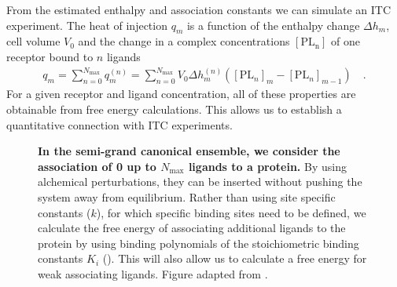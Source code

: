 \documentclass[10pt,final]{article}
\begin{document}
From the estimated enthalpy and association constants we can simulate an ITC experiment.
%
The heat of injection $q_m$ is a function of the enthalpy change $\Delta h_m$, cell volume $V_0$ and the change in a complex concentrations $[\mathrm{PL_n}]$ of one receptor bound to $n$ ligands
%
\begin{align}
 q_m = \sum \limits_{n=0}^{N_\mathrm{max}} q_m^{(n)} = \sum \limits_{n=0}^{N_\mathrm{max}} V_0 \Delta h_m^{(n)} \left( [\mathrm{PL}_n]_m - [\mathrm{PL}_n]_{m-1} \right) \quad. \label{equation:liberated-heat}
\end{align}
%
For a given receptor and ligand concentration, all of these properties are obtainable from free energy calculations. 
%
This allows us to establish a quantitative connection with ITC experiments.

\begin{figure}[H]
  \centering
  \caption{\textbf{In the semi-grand canonical ensemble, we consider the association of 0 up to $N_\mathrm{max}$ ligands to a protein.} By using alchemical perturbations, they can be inserted without pushing the system away from equilibrium. Rather than using site specific constants ($k$), for which specific binding sites need to be defined, we calculate the free energy of associating additional ligands to the protein by using binding polynomials of the stoichiometric binding constants $K_i$ (). This will also allow us to calculate a free energy for weak associating ligands. Figure adapted from \textcite{Klotz1997a}. }
  \label{figure:semi-grand}
\end{figure}
\end{document}

